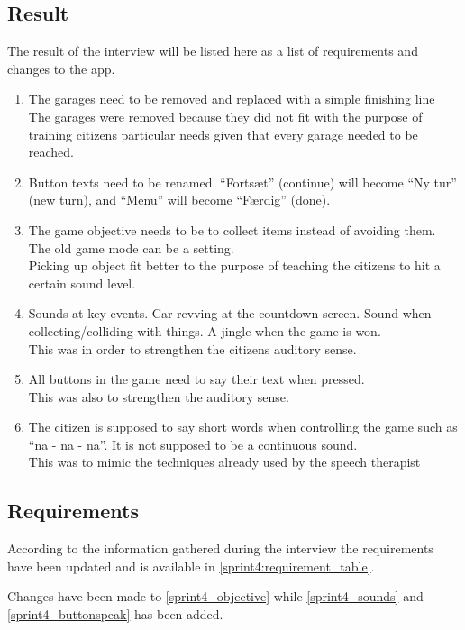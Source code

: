\subsection{Result}
The result of the interview will be listed here as a list of requirements and changes to the app.

\begin{enumerate}
\item The garages need to be removed and replaced with a simple finishing line\\
The garages were removed because they did not fit with the purpose of training citizens particular needs given that every garage needed to be reached.
\item Button texts need to be renamed. ``Fortsæt'' (continue) will become ``Ny tur'' (new turn), and ``Menu'' will become ``Færdig'' (done).
\item The game objective needs to be to collect items instead of avoiding them. The old game mode can be a setting.\\
Picking up object fit better to the purpose of teaching the citizens to hit a certain sound level.
\item Sounds at key events. Car revving at the countdown screen. Sound when collecting/colliding with things.
A jingle when the game is won.\\
This was in order to strengthen the citizens auditory sense.
\item All buttons in the game need to say their text when pressed.\\
This was also to strengthen the auditory sense.
\item The citizen is supposed to say short words when controlling the game such as ``na - na - na''. It is not supposed to be a continuous sound.\\
This was to mimic the techniques already used by the speech therapist
\end{enumerate}

\subsection{Requirements}\label{sprint4_req}
According to the information gathered during the interview the requirements have been updated and is available in \cref{sprint4:requirement_table}.

Changes have been made to \cref{sprint4_objective} while \cref{sprint4_sounds} and \cref{sprint4_buttonspeak} has been added.

